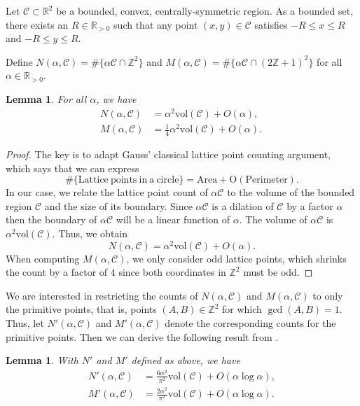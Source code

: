 \documentclass[12pt]{amsart}
\newcommand{\Z}{\mathbb{Z}}
\newcommand{\R}{\mathbb{R}}
\theoremstyle{plain}
\newtheorem{lemma}[theorem]{Lemma}
\begin{document}
Let $\mathcal{C} \subset\R^2$ be a bounded, convex, centrally-symmetric region.
As a bounded set, there exists an $R\in \R_{>0}$ such that any point $(x,y)\in\mathcal{C}$ satisfies $-R\leq x\leq R$ and $-R\leq y\leq R$.

Define $N(\alpha, \mathcal{C}) = \#\{\alpha\mathcal{C} \cap \mathbb{Z}^2\}$ and $M(\alpha, \mathcal{C}) = \#\{\alpha \mathcal{C} \cap (2\mathbb{Z}+1)^2\}$ for all $\alpha \in \R_{>0}$. 


\begin{lemma}\label{lem:convexcount} For all $\alpha$, we have 
\begin{align*}
    N(\alpha, \mathcal{C}) &= \alpha^2 \mathrm{vol}(\mathcal{C}) + O(\alpha), \\ M(\alpha, \mathcal{C}) &= \frac{1}{4} \alpha^2 \mathrm{vol}(\mathcal{C}) + O(\alpha).\
\end{align*}    
\end{lemma}

\begin{proof} The key is to adapt Gauss' classical lattice point counting argument, which says that we can express 
\[ \#\{\mathrm{Lattice \ points \ in \ a \ circle\} = \mathrm{Area} + O(\mathrm{Perimeter}).} \] 
In our case, we relate the lattice point count of $\alpha \mathcal{C}$ to the volume of the bounded region $\mathcal{C}$ and the size of its boundary. Since $\alpha \mathcal{C}$ is a dilation of $\mathcal{C}$ by a factor $\alpha$ then the boundary of $\alpha\mathcal{C}$ will be a linear function of $\alpha$. The volume of $\alpha\mathcal{C}$ is $\alpha^2 \mathrm{vol}(\mathcal{C})$. Thus, we obtain 
\[ N(\alpha, \mathcal{C}) = \alpha^2 \mathrm{vol}(\mathcal{C}) + O(\alpha).\]
When computing $M(\alpha, \mathcal{C})$, we only consider odd lattice points, which shrinks the count by a factor of $4$ since both coordinates in $\mathbb{Z}^2$ must be odd. 
\end{proof}

We are interested in restricting the counts of $N(\alpha, \mathcal{C})$ and $M(\alpha, \mathcal{C})$ to only the primitive points, that is, points $(A,B)\in \Z^2$ for which $\gcd(A, B) = 1$. Thus, let $N'(\alpha, \mathcal{C})$ and $M'(\alpha, \mathcal{C})$ denote the corresponding counts for the primitive points. Then we can derive the following result from . 

\begin{lemma}\label{lem:primitive}
With $N'$ and $M'$ defined as above, we have
\begin{align*}
    N'(\alpha, \mathcal{C}) &= \frac{6 \alpha^2}{\pi^2} \mathrm{vol}(\mathcal{C}) + O(\alpha \log \alpha),\\ 
M'(\alpha, \mathcal{C}) &= \frac{2\alpha^2}{\pi^2} \mathrm{vol}(\mathcal{C}) + O(\alpha \log \alpha). 
\end{align*}
\end{lemma}
\end{document}

